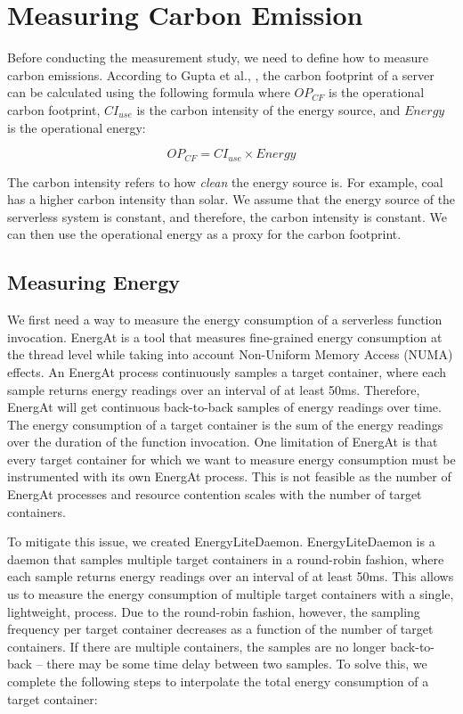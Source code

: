 \documentclass[times, 10pt,twocolumn]{article}
\begin{document}
\section{Measuring Carbon Emission}


Before conducting the measurement study, we need to define how to measure carbon emissions. According to Gupta et al., \cite{gupta2022act}, the carbon footprint of a server can be calculated using the following formula where $OP_{CF}$ is the operational carbon footprint, $CI_{use}$ is the carbon intensity of the energy source, and $Energy$ is the operational energy:

\begin{equation}
   OP_{CF} = CI_{use} \times Energy
\end{equation}

The carbon intensity refers to how \textit{clean} the energy source is. For example, coal has a higher carbon intensity than solar. We assume that the energy source of the serverless system is constant, and therefore, the carbon intensity is constant. We can then use the operational energy as a proxy for the carbon footprint.

\subsection{Measuring Energy}
We first need a way to measure the energy consumption of a serverless function invocation. EnergAt \cite{he2023hotcarbon} is a tool that measures fine-grained energy consumption at the thread level while taking into account Non-Uniform Memory Access (NUMA) effects. An EnergAt process continuously samples a target container, where each sample returns energy readings over an interval of at least 50ms. Therefore, EnergAt will get continuous back-to-back samples of energy readings over time. The energy consumption of a target container is the sum of the energy readings over the duration of the function invocation. One limitation of EnergAt is that every target container for which we want to measure energy consumption must be instrumented with its own EnergAt process. This is not feasible as the number of EnergAt processes and resource contention scales with the number of target containers.

To mitigate this issue, we created EnergyLiteDaemon. EnergyLiteDaemon is a daemon that samples multiple target containers in a round-robin fashion, where each sample returns energy readings over an interval of at least 50ms. This allows us to measure the energy consumption of multiple target containers with a single, lightweight, process. Due to the round-robin fashion, however, the sampling frequency per target container decreases as a function of the number of target containers. If there are multiple containers, the samples are no longer back-to-back -- there may be some time delay between two samples. To solve this, we complete the following steps to interpolate the total energy consumption of a target container:
\end{document}
